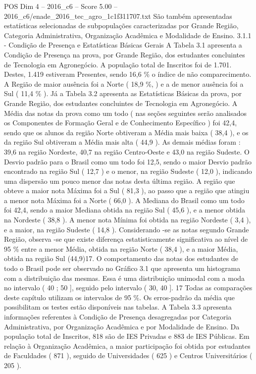 \begin{textsample}{POS Dim 4 – 2016\_c6 – Score 5.00 – 2016\_c6/enade\_2016\_tec\_agro\_1c1f311707.txt}
São também apresentadas estatísticas selecionadas de subpopulações caracterizadas por Grande Região, Categoria Administrativa, Organização Acadêmica e Modalidade de Ensino. 3.1.1 - Condição de Presença e Estatísticas Básicas Gerais A Tabela 3.1 apresenta a Condição de Presença na prova, por Grande Região, dos estudantes concluintes de Tecnologia em Agronegócio.
A população total de Inscritos foi de 1.701.
Destes, 1.419 estiveram Presentes, sendo 16,6 \% o índice de não comparecimento.
A Região de maior ausência foi a Norte ( 18,9 \%, ) e a de menor ausência foi a Sul ( 11,4 \% ).
Já a Tabela 3.2 apresenta as Estatísticas Básicas da prova, por Grande Região, dos estudantes concluintes de Tecnologia em Agronegócio.
A Média das notas da prova como um todo ( nas seções seguintes serão analisados os Componentes de Formação Geral e de Conhecimento Específico ) foi 42,4, sendo que os alunos da região Norte obtiveram a Média mais baixa ( 38,4 ), e os da região Sul obtiveram a Média mais alta ( 44,9 ).
As demais médias foram : 39,6 na região Nordeste, 40,7 na região Centro-Oeste e 43,0 na região Sudeste.
O Desvio padrão para o Brasil como um todo foi 12,5, sendo o maior Desvio padrão encontrado na região Sul ( 12,7 ) e o menor, na região Sudeste ( 12,0 ), indicando uma dispersão um pouco menor das notas desta última região.
A região que obteve a maior nota Máxima foi a Sul ( 81,3 ), ao passo que a região que atingiu a menor nota Máxima foi a Norte ( 66,0 ).
A Mediana do Brasil como um todo foi 42,4, sendo a maior Mediana obtida na região Sul ( 45,6 ), e a menor obtida na Nordeste ( 38,8 ).
A menor nota Mínima foi obtida na região Nordeste ( 3,4 ), e a maior, na região Sudeste ( 14,8 ).
Considerando -se as notas segundo Grande Região, observa -se que existe diferença estatisticamente significativa ao nível de 95 \% entre a menor Média, obtida na região Norte ( 38,4 ), e a maior Média, obtida na região Sul (44,9)17.
O comportamento das notas dos estudantes de todo o Brasil pode ser observado no Gráfico 3.1 que apresenta um histograma com a distribuição das mesmas.
Essa é uma distribuição unimodal com a moda no intervalo ( 40 ; 50 ], seguido pelo intervalo ( 30, 40 ]. 17 Todas as comparações deste capítulo utilizam os intervalos de 95 \%.
Os erros-padrão da média que possibilitam os testes estão disponíveis nas tabelas.
A Tabela 3.3 apresenta informações referentes à Condição de Presença desagregadas por Categoria Administrativa, por Organização Acadêmica e por Modalidade de Ensino.
Da população total de Inscritos, 818 são de IES Privadas e 883 de IES Públicas.
Em relação à Organização Acadêmica, a maior participação foi obtida por estudantes de Faculdades ( 871 ), seguido de Universidades ( 625 ) e Centros Universitários ( 205 ).

\end{textsample}
